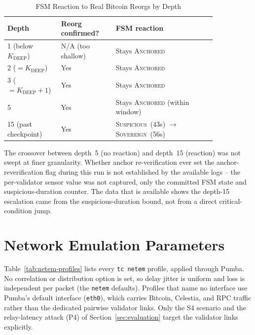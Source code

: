 \begin{table}[h]
\caption{FSM Reaction to Real Bitcoin Reorgs by Depth}
\label{tab:reorg}
\centering
\scriptsize
\begin{tabular}{@{}p{0.16\linewidth}p{0.24\linewidth}p{0.44\linewidth}@{}}
\toprule
\textbf{Depth} & \textbf{Reorg confirmed?} & \textbf{FSM reaction} \\
\midrule
1 (below $K_{\text{DEEP}}$) & N/A (too shallow) & Stays \textsc{Anchored} \\
2 ($=K_{\text{DEEP}}$)      & Yes & Stays \textsc{Anchored} \\
3 ($=K_{\text{DEEP}}{+}1$)  & Yes & Stays \textsc{Anchored} \\
5                           & Yes & Stays \textsc{Anchored} (within window) \\
15 (past checkpoint)        & Yes & \textsc{Suspicious}~(43s) $\to$ \textsc{Sovereign}~(56s) \\
\bottomrule
\end{tabular}
\end{table}

The crossover between depth~5 (no reaction) and depth~15 (reaction) was
not swept at finer granularity. Whether anchor re-verification ever set the
anchor-reverification flag during this run is not established by the
available logs -- the per-validator sensor value was not captured, only the
committed FSM state and suspicious-duration counter. The data that is
available shows the depth-15 escalation came from the suspicious-duration
bound, not from a direct critical-condition jump.

\FloatBarrier
\section{Network Emulation Parameters}
\label{app:netem}

Table~\ref{tab:netem-profiles} lists every \texttt{tc netem} profile, applied
through Pumba. No correlation or distribution option is set, so delay jitter
is uniform and loss is independent per packet (the \texttt{netem} defaults).
Profiles that name no interface use Pumba's default interface
(\texttt{eth0}), which carries Bitcoin, Celestia, and RPC traffic rather than
the dedicated pairwise validator links. Only the S4 scenario and the relay-latency attack (P4) of
Section~\ref{sec:evaluation} target the validator links explicitly.

